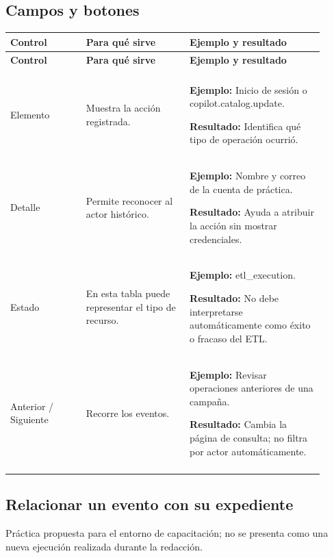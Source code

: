 \subsection{Campos y botones}
\begingroup
\fontsize{10}{12.5}\selectfont
\setlength{\tabcolsep}{5pt}
\renewcommand{\arraystretch}{1.15}
\begin{longtable}{@{}>{\RaggedRight\arraybackslash}p{0.22\linewidth}>{\RaggedRight\arraybackslash}p{0.3\linewidth}>{\RaggedRight\arraybackslash}p{0.39\linewidth}@{}}
\toprule
\textbf{Control} & \textbf{Para qué sirve} & \textbf{Ejemplo y resultado} \\
\midrule
\endfirsthead
\toprule
\textbf{Control} & \textbf{Para qué sirve} & \textbf{Ejemplo y resultado} \\
\midrule
\endhead
\midrule
\multicolumn{3}{r}{\footnotesize Continúa en la página siguiente}\\
\endfoot
\bottomrule
\endlastfoot
Elemento & Muestra la acción registrada. & \textbf{Ejemplo:} Inicio de sesión o copilot.catalog.update.\par\smallskip\textbf{Resultado:} Identifica qué tipo de operación ocurrió. \\
\addlinespace[3pt]
Detalle & Permite reconocer al actor histórico. & \textbf{Ejemplo:} Nombre y correo de la cuenta de práctica.\par\smallskip\textbf{Resultado:} Ayuda a atribuir la acción sin mostrar credenciales. \\
\addlinespace[3pt]
Estado & En esta tabla puede representar el tipo de recurso. & \textbf{Ejemplo:} etl\_\allowbreak{}execution.\par\smallskip\textbf{Resultado:} No debe interpretarse automáticamente como éxito o fracaso del ETL. \\
\addlinespace[3pt]
Anterior / Siguiente & Recorre los eventos. & \textbf{Ejemplo:} Revisar operaciones anteriores de una campaña.\par\smallskip\textbf{Resultado:} Cambia la página de consulta; no filtra por actor automáticamente. \\
\addlinespace[3pt]
\end{longtable}
\endgroup

\subsection{Relacionar un evento con su expediente}
Práctica propuesta para el entorno de capacitación; no se presenta como una nueva ejecución realizada durante la redacción.

